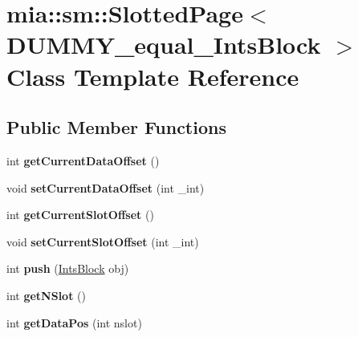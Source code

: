 \hypertarget{classmia_1_1sm_1_1_slotted_page}{\section{mia\-:\-:sm\-:\-:Slotted\-Page$<$ D\-U\-M\-M\-Y\-\_\-equal\-\_\-\-Ints\-Block $>$ Class Template Reference}
\label{classmia_1_1sm_1_1_slotted_page}
}
\subsection*{Public Member Functions}
\begin{DoxyCompactItemize}
\item 
\hypertarget{classmia_1_1sm_1_1_slotted_page_a80fa709a033624abdf179da402eec86b}{int {\bfseries get\-Current\-Data\-Offset} ()}\label{classmia_1_1sm_1_1_slotted_page_a80fa709a033624abdf179da402eec86b}

\item 
\hypertarget{classmia_1_1sm_1_1_slotted_page_abc9f353959a908a721f45f244a4bf414}{void {\bfseries set\-Current\-Data\-Offset} (int \-\_\-int)}\label{classmia_1_1sm_1_1_slotted_page_abc9f353959a908a721f45f244a4bf414}

\item 
\hypertarget{classmia_1_1sm_1_1_slotted_page_abfcb2210583834695b8a4f93fbc41ad8}{int {\bfseries get\-Current\-Slot\-Offset} ()}\label{classmia_1_1sm_1_1_slotted_page_abfcb2210583834695b8a4f93fbc41ad8}

\item 
\hypertarget{classmia_1_1sm_1_1_slotted_page_acca7b66588d4b7aeb851982648c42355}{void {\bfseries set\-Current\-Slot\-Offset} (int \-\_\-int)}\label{classmia_1_1sm_1_1_slotted_page_acca7b66588d4b7aeb851982648c42355}

\item 
\hypertarget{classmia_1_1sm_1_1_slotted_page_ac4980f9c0cdd0e9bd8abae417d70a196}{int {\bfseries push} (\hyperlink{classmia_1_1sm_1_1_ints_block}{Ints\-Block} obj)}\label{classmia_1_1sm_1_1_slotted_page_ac4980f9c0cdd0e9bd8abae417d70a196}

\item 
\hypertarget{classmia_1_1sm_1_1_slotted_page_ac2224c6c8cebda94b2f0ee9b9f8eba9c}{int {\bfseries get\-N\-Slot} ()}\label{classmia_1_1sm_1_1_slotted_page_ac2224c6c8cebda94b2f0ee9b9f8eba9c}

\item 
\hypertarget{classmia_1_1sm_1_1_slotted_page_a7ba7f6a8378157908b99b87b4538c36e}{int {\bfseries get\-Data\-Pos} (int nslot)}\label{classmia_1_1sm_1_1_slotted_page_a7ba7f6a8378157908b99b87b4538c36e}


\end{DoxyCompactItemize}
